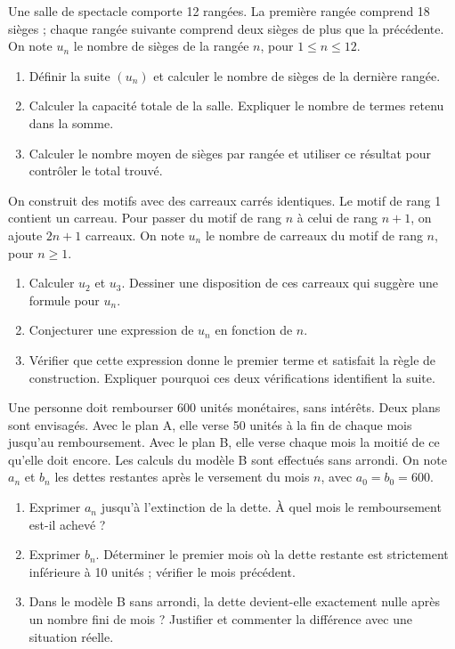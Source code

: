 Une salle de spectacle comporte 12 rangées. La première rangée comprend 18 sièges ; chaque rangée suivante comprend deux sièges de plus que la précédente. On note $u_n$ le nombre de sièges de la rangée $n$, pour $1\leq n\leq12$.
\begin{enumerate}[label=\arabic*.]
\item Définir la suite $(u_n)$ et calculer le nombre de sièges de la dernière rangée.
\item Calculer la capacité totale de la salle. Expliquer le nombre de termes retenu dans la somme.
\item Calculer le nombre moyen de sièges par rangée et utiliser ce résultat pour contrôler le total trouvé.
\end{enumerate}
On construit des motifs avec des carreaux carrés identiques. Le motif de rang 1 contient un carreau. Pour passer du motif de rang $n$ à celui de rang $n+1$, on ajoute $2n+1$ carreaux. On note $u_n$ le nombre de carreaux du motif de rang $n$, pour $n\geq1$.
\begin{enumerate}[label=\arabic*.]
\item Calculer $u_2$ et $u_3$. Dessiner une disposition de ces carreaux qui suggère une formule pour $u_n$.
\item Conjecturer une expression de $u_n$ en fonction de $n$.
\item Vérifier que cette expression donne le premier terme et satisfait la règle de construction. Expliquer pourquoi ces deux vérifications identifient la suite.
\end{enumerate}
Une personne doit rembourser 600 unités monétaires, sans intérêts. Deux plans sont envisagés. Avec le plan A, elle verse 50 unités à la fin de chaque mois jusqu’au remboursement. Avec le plan B, elle verse chaque mois la moitié de ce qu’elle doit encore. Les calculs du modèle B sont effectués sans arrondi. On note $a_n$ et $b_n$ les dettes restantes après le versement du mois $n$, avec $a_0=b_0=600$.
\begin{enumerate}[label=\arabic*.]
\item Exprimer $a_n$ jusqu’à l’extinction de la dette. À quel mois le remboursement est-il achevé ?
\item Exprimer $b_n$. Déterminer le premier mois où la dette restante est strictement inférieure à 10 unités ; vérifier le mois précédent.
\item Dans le modèle B sans arrondi, la dette devient-elle exactement nulle après un nombre fini de mois ? Justifier et commenter la différence avec une situation réelle.
\end{enumerate}

